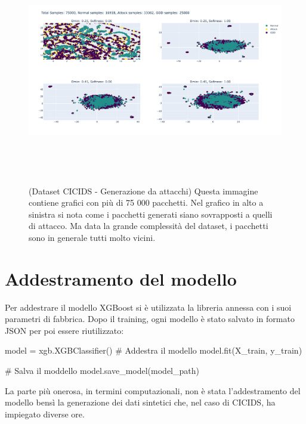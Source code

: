 \begin{figure}[htpb]
    \centering
    \includegraphics[width=\textwidth,height=10cm,keepaspectratio=true]{img/gen_test/cicids/CICIDS18_attack_only_25k.png}
    \caption{
      (Dataset CICIDS - Generazione da attacchi) Questa immagine contiene grafici con più di 75 000 pacchetti. Nel grafico in alto a sinistra si nota come i pacchetti generati siano sovrapposti a quelli di attacco. Ma data la grande complessità del dataset, i pacchetti sono in generale tutti molto vicini.
    }
    \label{fig:gen_CICIDS_attack_2}
\end{figure}



\section{Addestramento del modello}

Per addestrare il modello XGBoost si è utilizzata la libreria annessa con i suoi parametri di fabbrica. Dopo il training, ogni modello è stato salvato in formato JSON per poi essere riutilizzato:

\begin{python}
model = xgb.XGBClassifier()
# Addestra il modello
model.fit(X_train, y_train)

# Salva il moddello
model.save_model(model_path)
\end{python}

La parte più onerosa, in termini computazionali, non è stata l'addestramento del modello bensì la generazione dei dati sintetici che, nel caso di CICIDS, ha impiegato diverse ore.

